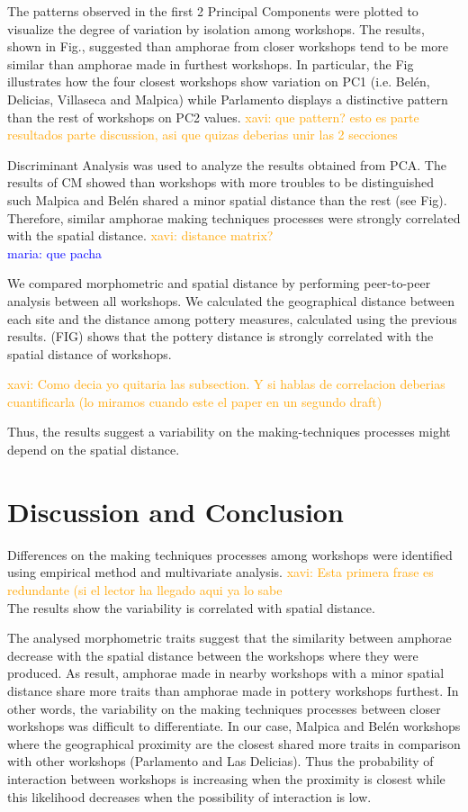 \documentclass[review]{elsarticle}
\newcommand{\memo}[2]{\textcolor{#1}{#2}}
\newcommand{\xavi}[1]{\memo{orange}{xavi: #1\\}}
\newcommand{\maria}[1]{\memo{blue}{maria: #1\\}}
\begin{document}
The patterns observed in the first 2 Principal Components were plotted to visualize the degree of variation by isolation among workshops. The results, shown in Fig., suggested than amphorae from closer workshops tend to be more similar than amphorae made in furthest workshops. In particular, the Fig illustrates how the four closest workshops show variation on PC1 (i.e. Belén, Delicias, Villaseca and Malpica) while Parlamento displays a distinctive pattern than the rest of workshops on PC2 values. 
\xavi{que pattern? esto es parte resultados parte discussion, asi que quizas deberias unir las 2 secciones}


Discriminant Analysis was used to analyze the results obtained from PCA. The results of CM showed than workshops with more troubles to be distinguished such Malpica and Bel\'en shared a minor spatial distance than the rest (see Fig). Therefore, similar amphorae making techniques processes were strongly correlated with the spatial distance. 
\xavi{distance matrix?}
\maria{que pacha}

We compared morphometric and spatial distance by performing peer-to-peer analysis between all workshops. We calculated the geographical distance between each site and the distance among pottery measures, calculated using the previous results. (FIG) shows that the pottery distance is strongly correlated with the spatial distance of workshops.


\xavi{Como decia yo quitaria las subsection. Y si hablas de correlacion deberias cuantificarla (lo miramos cuando este el paper en un segundo draft)}



Thus, the results suggest a variability on the making-techniques processes might depend on the spatial distance.  

\section{Discussion and Conclusion}


Differences on the making techniques processes among workshops were identified using empirical method and multivariate analysis. \xavi{Esta primera frase es redundante (si el lector ha llegado aqui ya lo sabe} The results show the variability is correlated with spatial distance.  

The analysed morphometric traits suggest that the similarity between amphorae decrease with the spatial distance between the workshops where they were produced. As result, amphorae made in nearby workshops with a minor spatial distance share more traits than amphorae made in pottery workshops furthest. In other words, the variability on the making techniques processes between closer workshops was difficult to differentiate. In our case, Malpica and Bel\'en workshops where the geographical proximity are the closest shared more traits in comparison with other workshops (Parlamento and Las Delicias). Thus the probability of interaction between workshops is increasing when the proximity is closest while this likelihood decreases when the possibility of interaction is low. 
\end{document}
